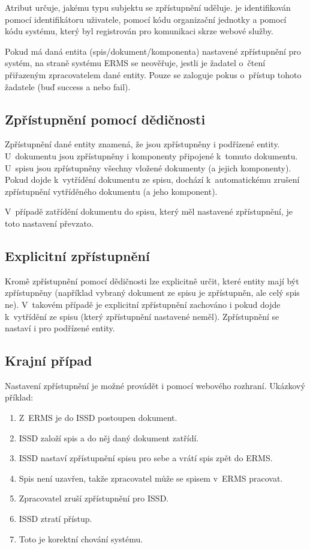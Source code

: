 \documentclass[
  master,
  field=ainfp,
  biblatex,
  language=czech,
  glossaries,
  theorems=false,
  index
]{kidiplom}
\begin{document}
Atribut  určuje, jakému typu subjektu se zpřístupnění uděluje.  je identifikován pomocí identifikátoru uživatele,  pomocí kódu organizační jednotky a  pomocí kódu systému, který byl registrován pro komunikaci skrze webové služby.

Pokud má daná entita (spis/dokument/komponenta) nastavené zpřístupnění pro systém, na straně systému ERMS se neověřuje, jestli je žadatel o~čtení přiřazeným zpracovatelem dané entity. Pouze se zaloguje pokus o~přístup tohoto žadatele (buď success a nebo fail).

\subsection{Zpřístupnění pomocí dědičnosti}
Zpřístupnění dané entity znamená, že jsou zpřístupněny i podřízené entity. U~dokumentu jsou zpřístupněny i komponenty připojené k~tomuto dokumentu. U~spisu jsou zpřístupněny všechny vložené dokumenty (a jejich komponenty). Pokud dojde k~vytřídění dokumentu ze spisu, dochází k~automatickému zrušení zpřístupnění vytříděného dokumentu (a jeho komponent).

V~případě zatřídění dokumentu do spisu, který měl nastavené zpřístupnění, je toto nastavení převzato.

\subsection{Explicitní zpřístupnění}
Kromě zpřístupnění pomocí dědičnosti lze explicitně určit, které entity mají být zpřístupněny (například vybraný dokument ze spisu je zpřístupněn, ale celý spis ne). V~takovém případě je explicitní zpřístupnění zachováno i pokud dojde k~vytřídění ze spisu (který zpřístupnění nastavené neměl). Zpřístupnění se nastaví i pro podřízené entity.

\subsection{Krajní případ}
Nastavení zpřístupnění je možné provádět i pomocí webového rozhraní.
Ukázkový příklad:
\begin{enumerate}
	\item Z~ERMS je do ISSD postoupen dokument.
	\item ISSD založí spis a do něj daný dokument zatřídí.
	\item ISSD nastaví zpřístupnění spisu pro sebe a vrátí spis zpět do ERMS.
	\item Spis není uzavřen, takže zpracovatel může se spisem v~ERMS pracovat.
	\item Zpracovatel zruší zpřístupnění pro ISSD.
	\item ISSD ztratí přístup.
	\item Toto je korektní chování systému.
\end{enumerate}
\end{document}
